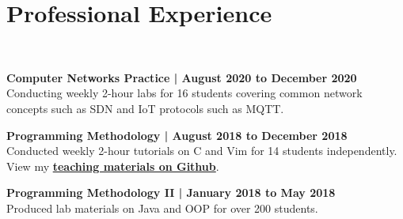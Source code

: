 \documentclass[a4paper]{resume-template} %
\begin{document}
\begin{minipage}[t]{0.60\textwidth} 


\section{Professional Experience}
\\
\vspace{10pt} %
\begin{tightemize}
\item {\fontsize{10}{10}\selectfont\bfseries Computer Networks Practice | August 2020 to December 2020}\\ Conducting weekly 2-hour labs for 16 students covering common network concepts such as SDN and IoT protocols such as MQTT.
\item {\fontsize{10}{10}\selectfont\bfseries Programming Methodology | August 2018 to December 2018}\\ Conducted weekly 2-hour tutorials on C and Vim for 14 students independently. View my {\bf \href{https://github.com/DigiPie/CS1010-Tutorial-C09}{teaching materials on Github}}.
\item {\fontsize{10}{10}\selectfont\bfseries Programming Methodology II | January 2018 to May 2018}\\ Produced lab materials on Java and OOP for over 200 students.
\end{tightemize}
\sectionsep


\end{minipage}
\end{document}
